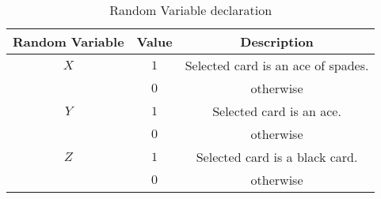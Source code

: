 \begin{table}[H]
\centering
\def\arraystretch{1.5}
\begin{tabular}{|c|c|c|}
\hline
\textbf{Random Variable} & \textbf{Value} & \textbf{Description} \\ \hline 
	$X$ & $1$ & Selected card is an ace of spades.\\ \hhline{~--}
	    & $0$ & otherwise \\ \hline
	$Y$ & $1$ & Selected card is an ace. \\ \hhline{~--}
	    & $0$ & otherwise\\ \hline
	$Z$ & $1$ & Selected card is a black card.\\ \hhline{~--}
	    & $0$ & otherwise\\ \hline
\end{tabular}
\label{tab: table 1}
\caption{Random Variable declaration}
\end{table}
